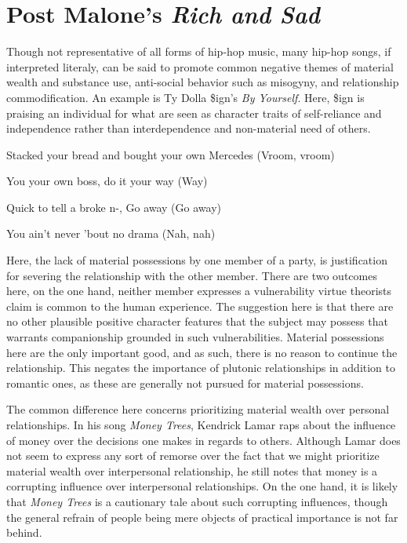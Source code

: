 \documentclass[
  12pt,
]{book}
\theoremstyle{definition}
\theoremstyle{definition}
\theoremstyle{definition}
\theoremstyle{definition}
\theoremstyle{remark}
\begin{document}
\section{\texorpdfstring{Post Malone's \emph{Rich and Sad}}{Post Malone's Rich and Sad}}\label{post-malones-rich-and-sad}

Though not representative of all forms of hip-hop music, many hip-hop songs, if interpreted literaly, can be said to promote common negative themes of material wealth and substance use, anti-social behavior such as misogyny, and relationship commodification. An example is Ty Dolla \$ign's \emph{By Yourself}. Here, \$ign is praising an individual for what are seen as character traits of self-reliance and independence rather than interdependence and non-material need of others.

Stacked your bread and bought your own Mercedes (Vroom, vroom)

You your own boss, do it your way (Way)

Quick to tell a broke n-, Go away (Go away)

You ain't never 'bout no drama (Nah, nah)

Here, the lack of material possessions by one member of a party, is justification for severing the relationship with the other member. There are two outcomes here, on the one hand, neither member expresses a vulnerability virtue theorists claim is common to the human experience. The suggestion here is that there are no other plausible positive character features that the subject may possess that warrants companionship grounded in such vulnerabilities. Material possessions here are the only important good, and as such, there is no reason to continue the relationship. This negates the importance of plutonic relationships in addition to romantic ones, as these are generally not pursued for material possessions.

The common difference here concerns prioritizing material wealth over personal relationships. In his song \emph{Money Trees}, Kendrick Lamar raps about the influence of money over the decisions one makes in regards to others. Although Lamar does not seem to express any sort of remorse over the fact that we might prioritize material wealth over interpersonal relationship, he still notes that money is a corrupting influence over interpersonal relationships. On the one hand, it is likely that \emph{Money Trees} is a cautionary tale about such corrupting influences, though the general refrain of people being mere objects of practical importance is not far behind.
\end{document}

